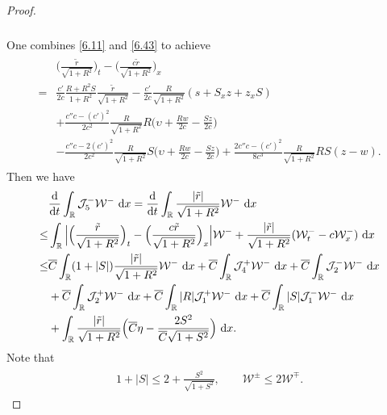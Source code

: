 \documentclass[11pt,reqno]{article}
\newcommand{\fr}{\frac}
\numberwithin{equation}{section}
\begin{document}
\begin{proof}
\begin{align}
\begin{split}
\end{split}
\end{align}
One combines \eqref{6.11} and \eqref{6.43} to achieve
\begin{align}\label{6.44}
\begin{split}
&\Big(\fr{\tilde{r}}{\sqrt{1+R^2}}\Big)_t-\Big(\fr{c\tilde{r}}{\sqrt{1+R^2}}\Big)_x \\
=&\fr{c'}{2c}\fr{R+R^2S}{1+R^2}\fr{\tilde{r}}{\sqrt{1+R^2}} -\fr{c'}{2c}\fr{R}{\sqrt{1+R^2}}(s +S_xz+z_xS ) \\ &+\fr{c''c-(c')^2}{2c^2}\fr{R}{\sqrt{1+R^2}}R\Big(\upsilon+\fr{Rw}{2c}-\fr{Sz}{2c}\Big) \\ &-\fr{c''c-2(c')^2}{2c^2}\fr{R}{\sqrt{1+R^2}}S\Big(\upsilon+\fr{Rw}{2c}-\fr{Sz}{2c}\Big) +\fr{2c''c-(c')^2}{8c^3}\fr{R}{\sqrt{1+R^2}}RS(z-w).
\end{split}
\end{align}
Then we have
\begin{align}\label{6.45}
\begin{split}
&\fr{{\rm d}}{{\rm d}t}\int_{\mathbb{R}} \mathcal{J}_{5}^-\mathcal{W}^-\ {\rm d}x=\fr{{\rm d}}{{\rm d}t}\int_{\mathbb{R}}\fr{|\tilde{r}|}{\sqrt{1+R^2}}\mathcal{W}^-\ {\rm d}x \\
\leq &\int_{\mathbb{R}}\Big|\Big(\fr{\tilde{r}}{\sqrt{1+R^2}}\Big)_t -\Big(\fr{c\tilde{r}}{\sqrt{1+R^2}}\Big)_x\Big|\mathcal{W}^- +\fr{|\tilde{r}|}{\sqrt{1+R^2}}(\mathcal{W}^{-}_t-c\mathcal{W}^{-}_x)\ {\rm d}x \\
\leq &\overline{C}\int_{\mathbb{R}} (1+|S|)\fr{|\tilde{r}|}{\sqrt{1+R^2}} \mathcal{W}^-\ {\rm d}x +\overline{C}\int_{\mathbb{R}}  \mathcal{J}_{4}^+\mathcal{W}^-\ {\rm d}x +\overline{C}\int_{\mathbb{R}}  \mathcal{J}_{2}^-\mathcal{W}^-\ {\rm d}x \\ & +\overline{C}\int_{\mathbb{R}}  \mathcal{J}_{2}^+\mathcal{W}^-\ {\rm d}x +\overline{C}\int_{\mathbb{R}}  |R|\mathcal{J}_{1}^+\mathcal{W}^-\ {\rm d}x
+\overline{C}\int_{\mathbb{R}}  |S|\mathcal{J}_{1}^-\mathcal{W}^-\ {\rm d}x \\
&+\int_{\mathbb{R}} \fr{|\tilde{r}|}{\sqrt{1+R^2}}\Big(\overline{C}\eta-\fr{2S^2}{\overline{C}\sqrt{1+S^2}}\Big)\ {\rm d}x.
\end{split}
\end{align}
Note that
\begin{align*}
\begin{split}
1+|S|\leq 2+\fr{S^2}{\sqrt{1+S^2}},\qquad \mathcal{W}^\pm\leq 2\mathcal{W}^\mp.
\end{split}
\end{align*}

\end{proof}
\end{document}
